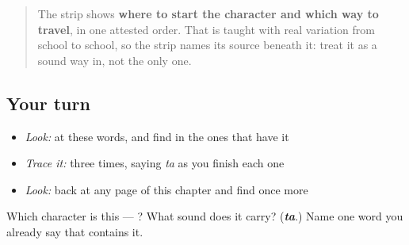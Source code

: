 \begin{quote}
The strip shows \textbf{where to start the character and which way to travel}, in one attested order. That is taught with real variation from school to school, so the strip names its source beneath it: treat it as a sound way in, not the only one.
\end{quote}

\subsection*{Your turn}
\begin{itemize}
\raggedright
  \item \emph{Look:} at these words, and find  in the ones that have it
\end{itemize}

\begin{quote}
\end{quote}

\begin{itemize}
\raggedright
  \item \emph{Trace it:}  three times, saying \emph{ta} as you finish each one
  \item \emph{Look:} back at any page of this chapter and find  once more
\end{itemize}

\begin{tcolorbox}[breakable,colback=teal!4,colframe=teal!35!black,title={Before you move on}]
Which character is this — ? What sound does it carry? (\emph{\textbf{ta}}.) Name one word you already say that contains it.
\end{tcolorbox}
